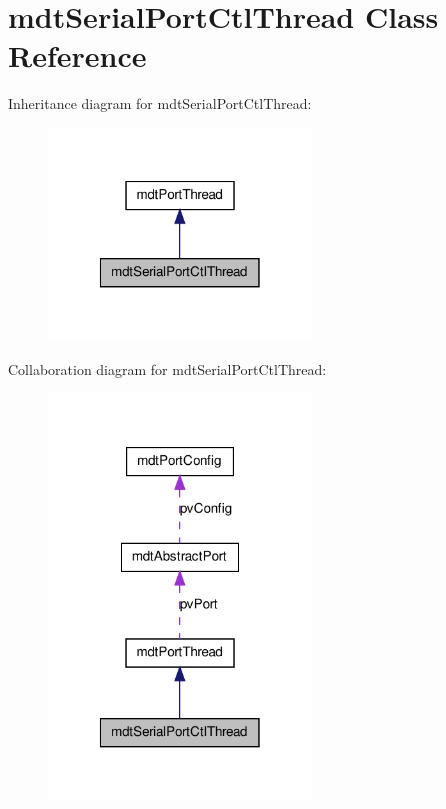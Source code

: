\hypertarget{classmdt_serial_port_ctl_thread}{
\section{mdtSerialPortCtlThread Class Reference}
\label{classmdt_serial_port_ctl_thread}
}


Inheritance diagram for mdtSerialPortCtlThread:\nopagebreak
\begin{figure}[H]
\begin{center}
\leavevmode
\includegraphics[width=198pt]{classmdt_serial_port_ctl_thread__inherit__graph}
\end{center}
\end{figure}


Collaboration diagram for mdtSerialPortCtlThread:\nopagebreak
\begin{figure}[H]
\begin{center}
\leavevmode
\includegraphics[width=198pt]{classmdt_serial_port_ctl_thread__coll__graph}
\end{center}
\end{figure}
